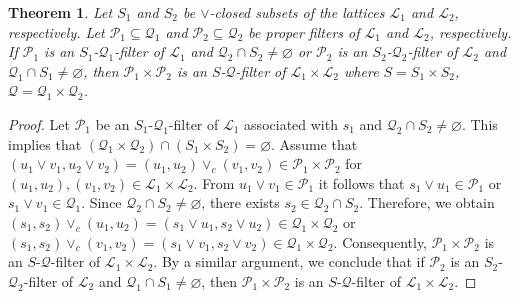 \documentclass[preprint,review,10pt]{amsart}
\newtheorem{theorem}{Theorem}[section]
\theoremstyle{definition}
\theoremstyle{remark}
\numberwithin{equation}{section}
\begin{document}
\begin{theorem} \label{car}
Let $S_1$ and $S_2$ be $\vee$-closed subsets of  the lattices $\mathcal{L}_1$ and $\mathcal{L}_2$, respectively. Let $\mathcal{P}_1 \subseteq \mathcal{Q}_1$ and  $\mathcal{P}_2 \subseteq \mathcal{Q}_2$ be proper filters of $\mathcal{L}_1$ and $\mathcal{L}_2$, respectively. If   $\mathcal{P}_1$ is an $S_1$-$\mathcal{Q}_1$-filter of $\mathcal{L}_1$ and $\mathcal{Q}_2 \cap S_2  \neq \varnothing$ or $\mathcal{P}_2$ is an $S_2$-$\mathcal{Q}_2$-filter of $\mathcal{L}_2$ and $\mathcal{Q}_1 \cap S_1 \neq \varnothing$, then $\mathcal{P}_1 \times \mathcal{P}_2$ is an $S$-$\mathcal{Q}$-filter of $\mathcal{L}_1 \times \mathcal{L}_2$ where $S= S_1 \times S_2$, $\mathcal{Q}=\mathcal{Q}_1 \times \mathcal{Q}_2$.
\end{theorem}
\begin{proof}
Let $\mathcal{P}_1$ be an $S_1$-$\mathcal{Q}_1$-filter of $\mathcal{L}_1$ associated with $s_1$ and $\mathcal{Q}_2 \cap S_2  \neq \varnothing$. This implies that   $  (\mathcal{Q}_1 \times \mathcal{Q}_2) \cap (S_1 \times  S_2) =\varnothing$.  Assume that $(u_1 \vee v_1,u_2 \vee v_2)=(u_1,u_2) \vee_c (v_1 , v_2) \in \mathcal{P}_1 \times \mathcal{P}_2$ for $(u_1,u_2),  (v_1 , v_2) \in \mathcal{L}_1 \times \mathcal{L}_2$. From $u_1 \vee v_1 \in \mathcal{P}_1$ it follows that  $s_1 \vee u_1 \in \mathcal{P}_1$ or $s_1 \vee v_1 \in \mathcal{Q}_1$. Since $\mathcal{Q}_2 \cap S_2 \neq \varnothing$, there exists $s_2 \in \mathcal{Q}_2 \cap S_2$. Therefore, we obtain $(s_1,s_2) \vee_c (u_1,u_2)=(s_1 \vee u_1,s_2 \vee u_2) \in \mathcal{Q}_1 \times \mathcal{Q}_2$ or $(s_1,s_2) \vee_c (v_1,v_2)=(s_1 \vee v_1,s_2 \vee v_2) \in \mathcal{Q}_1 \times \mathcal{Q}_2$. Consequently, $\mathcal{P}_1 \times \mathcal{P}_2$ is an $S$-$\mathcal{Q}$-filter of $\mathcal{L}_1 \times \mathcal{L}_2$. By a similar argument, we conclude that if $\mathcal{P}_2$ is an $S_2$-$\mathcal{Q}_2$-filter of $\mathcal{L}_2$ and $\mathcal{Q}_1 \cap S_1 \neq \varnothing$, then $\mathcal{P}_1 \times \mathcal{P}_2$ is an $S$-$\mathcal{Q}$-filter of $\mathcal{L}_1 \times \mathcal{L}_2$.


\end{proof}
\end{document}

